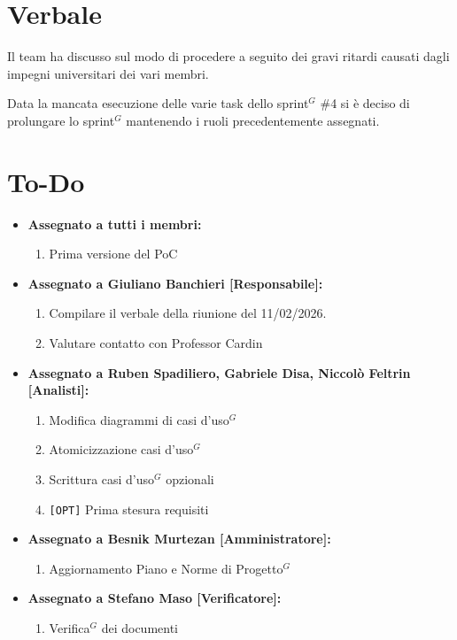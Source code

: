 \documentclass[a4paper,10pt]{article}
\begin{document}
\section*{Verbale}

Il team ha discusso sul modo di procedere a seguito dei gravi ritardi causati dagli impegni universitari dei vari membri.
\vspace{1\baselineskip}

Data la mancata esecuzione delle varie task dello sprint$^G$ \#4 si è deciso di prolungare lo sprint$^G$ mantenendo i ruoli precedentemente assegnati.



\section*{To-Do}
\begin{itemize}
\item \textbf{Assegnato a tutti i membri:}
\begin{enumerate}
    \item Prima versione del PoC
\end{enumerate}
\item \textbf{Assegnato a Giuliano Banchieri [Responsabile]:}
    \begin{enumerate}
    \item Compilare il verbale della riunione del 11/02/2026.
    \item Valutare contatto con Professor Cardin
    \end{enumerate}
\item \textbf{Assegnato a Ruben Spadiliero, Gabriele Disa, Niccolò Feltrin [Analisti]:}
    \begin{enumerate}
    \item Modifica diagrammi di casi d'uso$^G$
    \item Atomicizzazione casi d'uso$^G$
    \item Scrittura casi d'uso$^G$ opzionali
    \item \texttt{[OPT]} Prima stesura requisiti
    \end{enumerate}
\item \textbf{Assegnato a Besnik Murtezan [Amministratore]:}
    \begin{enumerate}
    \item Aggiornamento Piano e Norme di Progetto$^G$
    \end{enumerate}
\item \textbf{Assegnato a Stefano Maso [Verificatore]:}
    \begin{enumerate}
    \item Verifica$^G$ dei documenti
    \end{enumerate}
\end{itemize}
\end{document}
